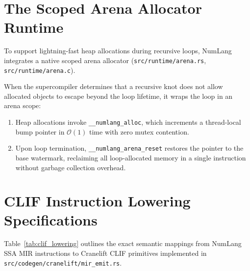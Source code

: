 \section{The Scoped Arena Allocator Runtime}
\label{sec:cranelift:arena}

To support lightning-fast heap allocations during recursive loops, NumLang integrates a native scoped arena allocator (\texttt{src/runtime/arena.rs}, \texttt{src/runtime/arena.c}).

When the supercompiler determines that a recursive knot does not allow allocated objects to escape beyond the loop lifetime, it wraps the loop in an arena scope:
\begin{enumerate}
    \item Heap allocations invoke \texttt{\_\_numlang\_alloc}, which increments a thread-local bump pointer in $\mathcal{O}(1)$ time with zero mutex contention.
    \item Upon loop termination, \texttt{\_\_numlang\_arena\_reset} restores the pointer to the base watermark, reclaiming all loop-allocated memory in a single instruction without garbage collection overhead.
\end{enumerate}

\section{CLIF Instruction Lowering Specifications}
\label{sec:cranelift:clif_specs}

Table~\ref{tab:clif_lowering} outlines the exact semantic mappings from NumLang SSA MIR instructions to Cranelift CLIF primitives implemented in \texttt{src/codegen/cranelift/mir\_emit.rs}.

